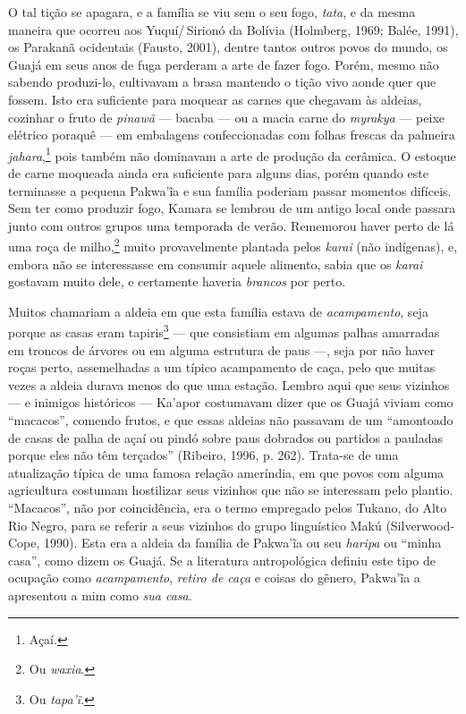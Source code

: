 O tal tição se apagara, e a família se viu sem o seu fogo,
\textit{tata}, e da mesma maneira que ocorreu aos Yuquí/\,Sirionó da Bolívia
(Holmberg, 1969; Balée, 1991), os Parakanã ocidentais (Fausto, 2001),
dentre tantos outros povos do mundo, os Guajá em seus anos de fuga
perderam a arte de fazer fogo. Porém, mesmo não sabendo produzi-lo,
cultivavam a brasa mantendo o tição vivo aonde quer que fossem. Isto era
suficiente para moquear as carnes que chegavam às aldeias, cozinhar o
fruto de \textit{pinawã} --- bacaba --- ou a macia carne do \textit{myrakya} --- peixe elétrico
poraquê --- em embalagens confeccionadas com folhas frescas
da palmeira \textit{jahara},\footnote{Açaí.} pois também não dominavam a arte de
produção da cerâmica. O estoque de carne moqueada ainda era suficiente
para alguns dias, porém quando este terminasse a pequena Pakwa'ĩa e sua
família poderiam passar momentos difíceis. Sem ter como produzir fogo,
Kamara se lembrou de um antigo local onde passara junto com outros
grupos uma temporada de verão. Rememorou haver perto de lá uma roça de
milho,\footnote{Ou \textit{waxia}.} muito provavelmente plantada pelos \textit{karai}
(não indígenas), e, embora não se interessasse em consumir aquele
alimento, sabia que os \textit{karai} gostavam muito dele, e certamente
haveria \textit{brancos} por perto.

Muitos chamariam a aldeia em que esta família estava de \textit{acampamento},
seja porque as casas eram tapiris\footnote{Ou \textit{tapa'ĩ}.} --- que consistiam em
algumas palhas amarradas em troncos de árvores ou em alguma estrutura de
paus ---, seja por não haver roças perto, assemelhadas a um típico
acampamento de caça, pelo que muitas vezes a aldeia durava menos do que
uma estação. Lembro aqui que seus vizinhos --- e inimigos históricos ---
Ka'apor costumavam dizer que os Guajá viviam como ``macacos'', comendo
frutos, e que essas aldeias não passavam de um ``amontoado de casas de
palha de açaí ou pindó sobre paus dobrados ou partidos a pauladas porque
eles não têm terçados'' (Ribeiro, 1996, p. 262). Trata-se de uma
atualização típica de uma famosa relação ameríndia, em que povos com
alguma agricultura costumam hostilizar seus vizinhos que não se
interessam pelo plantio. ``Macacos'', não por coincidência, era o termo
empregado pelos Tukano, do Alto Rio Negro, para se referir a seus
vizinhos do grupo linguístico Makú (Silverwood-Cope, 1990). Esta era a
aldeia da família de Pakwa'ĩa ou seu \textit{haripa} ou ``minha casa'',
como dizem os Guajá. Se a literatura antropológica definiu este tipo de
ocupação como \textit{acampamento}, \textit{retiro de caça} e coisas do gênero,
Pakwa'ĩa a apresentou a mim como \textit{sua casa}.

